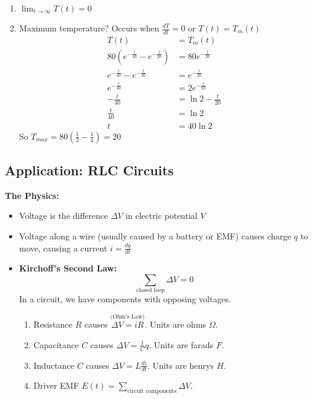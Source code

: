 \documentclass[../main.tex]{subfiles}
\begin{document}
\begin{example}[]
    \begin{enumerate}[mode=unboxed,label=\alph*),start=2]
        \item \( \boxed{ \lim_{t\to\infty}T(t)= 0 } \)
        \item Maximum temperature? Occurs when \( \frac{dT}{dt} =0\) or \( T(t)=T_{m}(t) \)
            \begin{align*}
                T(t) &= T_m(t) \\
                80(e^{-\frac{t}{40}}-e^{-\frac{t}{20}}) &= 80e^{-\frac{t}{20}} \\
                e^{-\frac{t}{40}}-e^{-\frac{t}{20}} &= e^{-\frac{t}{20}} \\
                e^{-\frac{t}{40}} &= 2e^{-\frac{t}{20}} \\
                -\frac{t}{40} &= \ln 2 - \frac{t}{20} \\
                \frac{t}{40} &= \ln 2 \\
                t &= 40\ln 2
            \end{align*}
            So \( T_{max} = 80\left( \frac{1}{2}-\frac{1}{4} \right) = \boxed{20} \)
    \end{enumerate}
\end{example}


\subsection{Application: RLC Circuits}

\textbf{The Physics:}
\begin{itemize}[mode=unboxed]
    \item Voltage is the difference \( \Delta V \) in electric potential \( V \)
    \item Voltage along a wire (usually caused by a battery or EMF) causes charge \( q \) to move,
        causing a current \( i = \frac{dq}{dt} \)
    \item \textbf{Kirchoff's Second Law:}
        \[ \sum_{\text{closed loop}} \Delta V = 0 \]
        In a circuit, we have components with opposing voltages.
        \begin{enumerate}
            \item Resistance \( R \) causes \( \overset{\text{(Ohm's Law)}}{\Delta V = iR} \). Units are ohms \( \Omega \).
            \item Capacitance \( C \) causes \( \Delta V = \frac{1}{C}q \). Units are farads \( F \).
            \item Inductance \( C \) causes \( \Delta V = L\frac{di}{dt} \). Units are henrys \( H \).
            \item Driver EMF \( E(t)=\sum_{\text{circuit components}} \Delta V \).
        \end{enumerate}
\end{itemize}
\end{document}
